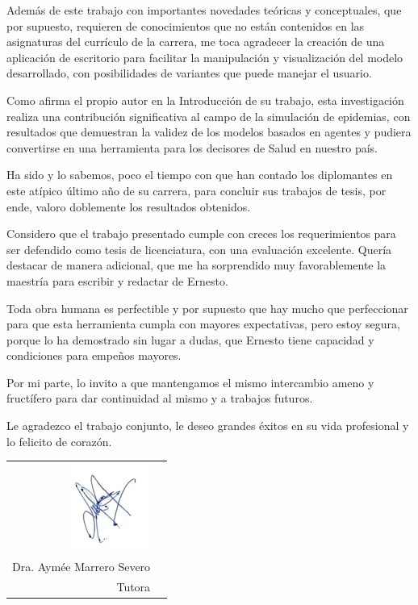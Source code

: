 \begin{opinion}
Además de este trabajo con importantes novedades teóricas y conceptuales, que por supuesto, requieren de conocimientos que no están contenidos en las asignaturas del currículo de la carrera, me toca agradecer la creación de una aplicación de escritorio para facilitar la manipulación y visualización del modelo desarrollado, con posibilidades de variantes que puede manejar el usuario. 

Como afirma el propio autor en la Introducción de su trabajo, esta investigación realiza una contribución significativa al campo de la simulación de epidemias, con resultados que demuestran la validez de los modelos basados en agentes y pudiera convertirse en una herramienta para los decisores de Salud en nuestro país.

Ha sido y lo sabemos, poco el tiempo con que han contado los diplomantes en este atípico último año de su carrera, para concluir sus trabajos de tesis, por ende, valoro doblemente los resultados obtenidos.

Considero que el trabajo presentado cumple con creces los requerimientos para ser defendido como tesis de licenciatura, con una evaluación excelente. Quería destacar de manera adicional, que me ha sorprendido muy favorablemente la maestría para escribir y redactar de Ernesto. 

Toda obra humana es perfectible y por supuesto que hay mucho que perfeccionar para que esta herramienta cumpla con mayores expectativas, pero estoy segura, porque lo ha demostrado sin lugar a dudas, que Ernesto tiene capacidad y condiciones para empeños mayores.

Por mi parte, lo invito a que mantengamos el mismo intercambio ameno y fructífero para dar continuidad al mismo y a trabajos futuros.

Le agradezco el trabajo conjunto, le deseo grandes éxitos en su vida profesional y lo felicito de corazón.

\begin{tabular}{r l}
    \includegraphics[width=0.2\linewidth]{Graphics/Opinion_Firma.png}\\
    \hrulefill \\
    Dra. Aymée Marrero Severo\\                    
    Tutora                                                        
\end{tabular}



\end{opinion}